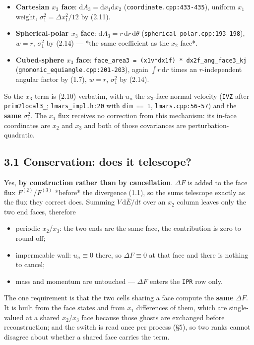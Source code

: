 \documentclass[11pt,a4paper]{article}
\begin{document}
\begin{itemize}
\item \textbf{Cartesian $x_3$ face}: $\mathrm{d}A_3=\mathrm{d}x_1\mathrm{d}x_2$
  (\texttt{coordinate.cpp:433-435}), uniform $x_1$ weight,
  $\sigma_1^2=\Delta x_1^2/12$ by (2.11).
\item \textbf{Spherical-polar $x_3$ face}: $\mathrm{d}A_3=r\,\mathrm{d}r\,\mathrm{d}\theta$
  (\texttt{spherical\_polar.cpp:193-198}), $w=r$, $\sigma_1^2$ by (2.14) — *the same
  coefficient as the $x_2$ face*.
\item \textbf{Cubed-sphere $x_3$ face}: \texttt{face\_area3 = (x1v*dx1f) * dx2f\_ang\_face3\_kj}
  (\texttt{gnomonic\_equiangle.cpp:201-203}), again $\int r\,\mathrm{d}r$ times an
  $r$-independent angular factor by (1.7), $w=r$, $\sigma_1^2$ by (2.14).
\end{itemize}

So the $x_3$ term is (2.10) verbatim, with $u_n$ the $x_3$-face normal velocity
(\texttt{IVZ} after \texttt{prim2local3\_}; \texttt{lmars\_impl.h:20} with \texttt{dim == 1},
\texttt{lmars.cpp:56-57}) and the \textbf{same} $\sigma_1^2$. The $x_1$ flux receives no
correction from this mechanism: its in-face coordinates are $x_2$ and $x_3$ and
both of those covariances are perturbation-quadratic.

\subsection*{3.1 Conservation: does it telescope?}

Yes, \textbf{by construction rather than by cancellation}. $\Delta F$ is added to the
face flux $F^{(2)}$/$F^{(3)}$ *before* the divergence (1.1), so the sums
telescope exactly as the flux they correct does. Summing $V\,\mathrm{d}\bar E/\mathrm{d}t$
over an $x_2$ column leaves only the two end faces, therefore

\begin{itemize}
\item periodic $x_2$/$x_3$: the two ends are the same face, the contribution is zero
  to round-off;
\item impermeable wall: $u_n\equiv0$ there, so $\Delta F\equiv0$ at that face and
  there is nothing to cancel;
\item mass and momentum are untouched — $\Delta F$ enters the \texttt{IPR} row only.
\end{itemize}

The one requirement is that the two cells sharing a face compute the \textbf{same}
$\Delta F$. It is built from the face states and from $x_1$ differences of them,
which are single-valued at a shared $x_2$/$x_3$ face because those ghosts are
exchanged before reconstruction; and the switch is read once per process (§5), so
two ranks cannot disagree about whether a shared face carries the term.
\end{document}
